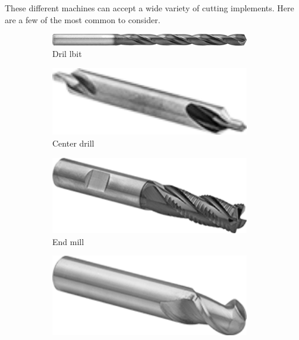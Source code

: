 \documentclass[10pt,letterpaper]{book}
\begin{document}
 These different machines can accept a wide variety of cutting implements. Here are a few of the most common to consider.
 
 \begin{figure}[H]
	\centering
	\begin{subfigure}[b]{.19\linewidth}
		\includegraphics[width=0.95\textwidth]{imgs/drillbit.png}
		\caption{Dril lbit}
	\end{subfigure} \begin{subfigure}[b]{.19\linewidth}
		\includegraphics[width=0.95\textwidth]{imgs/centerdrill.png}
		\caption{Center drill}
	\end{subfigure}	\begin{subfigure}[b]{.19\linewidth}
		\includegraphics[width=0.95\textwidth]{imgs/endmill.png}
		\caption{End mill}
	\end{subfigure}	\begin{subfigure}[b]{.19\linewidth}
		\includegraphics[width=0.95\textwidth]{imgs/ball_endmill.png}

\end{subfigure}
\end{figure}
\end{document}
